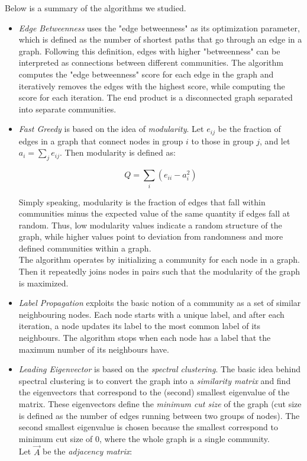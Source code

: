Below is a summary of the algorithms we studied.
\begin{itemize}

\item \textit{Edge Betweenness}\cite{girvannewman2002} uses the "edge betweenness" as its optimization parameter, which is defined as the number of shortest paths that go through an edge in a graph. Following this definition, edges with higher "betweenness" can be interpreted as connections between different communities. The algorithm computes the "edge betweenness" score for each edge in the graph and iteratively removes the edges with the highest score, while computing the score for each iteration. The end product is a disconnected graph separated into separate communities.

\item \textit{Fast Greedy}\cite{Newman_2004} is based on the idea of \textit{modularity}. Let $e_{ij}$ be the fraction of edges in a graph that connect nodes in group $i$ to those in group $j$, and let 
$a_i = \sum_j e_{ij}$. Then modularity is defined as:

\begin{equation}
\label{eqn:modularity}
Q = \sum_i (e_{ii}-a_i^2)
\end{equation}

Simply speaking, modularity is the fraction of edges that fall within communities minus the expected value of the same quantity if edges fall at random. Thus, low modularity values indicate a random structure of the graph, while higher values point to deviation from randomness and more defined communities within a graph.\\
The algorithm operates by initializing a community for each node in a graph. Then it repeatedly joins nodes in pairs such that the modularity of the graph is maximized.

\item \textit{Label Propagation}\cite{Raghavan_2007} exploits the basic notion of a community as a set of similar neighbouring nodes. Each node starts with a unique label, and after each iteration, a node updates its label to the most common label of its neighbours. The algorithm stops when each node has a label that the maximum number of its neighbours have.

\item \textit{Leading Eigenvector}\cite{Newman_2006} is based on the \textit{spectral clustering}. The basic idea behind spectral clustering is to convert the graph into a \textit{similarity matrix} and find the eigenvectors that correspond to the (second) smallest eigenvalue of the matrix. These eigenvectors define the \textit{minimum cut size} of the graph (cut size is defined as the number of edges running between two groups of nodes). The second smallest eigenvalue is chosen because the smallest correspond to minimum cut size of 0, where the whole graph is a single community.\\
Let $\vec{A}$ be the  \textit{adjacency matrix}:


\end{itemize}
